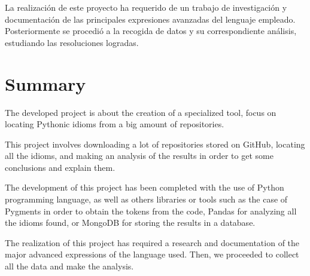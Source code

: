 \documentclass[a4paper, 12pt]{book}
\begin{document}
La realización de este proyecto ha requerido de un trabajo de investigación y documentación de las principales expresiones avanzadas del lenguaje empleado. Posteriormente se procedió a la recogida de datos y su correspondiente análisis, estudiando las resoluciones logradas.



\chapter*{Summary}

The developed project is about the creation of a specialized tool, focus on locating Pythonic idioms from a big amount of repositories.

This project involves downloading a lot of repositories stored on GitHub, locating all the idioms, and making an analysis of the results in order to get some conclusions and explain them.

The development of this project has been completed with the use of Python programming language, as well as others libraries or tools such as the case of Pygments in order to obtain the tokens from the code, Pandas for analyzing all the idioms found, or MongoDB for storing the results in a database.

The realization of this project has required a research and documentation of the major advanced expressions of the language used. Then, we proceeded to collect all the data and make the analysis. 



\tableofcontents 
\cleardoublepage
\listoffigures %
\end{document}
